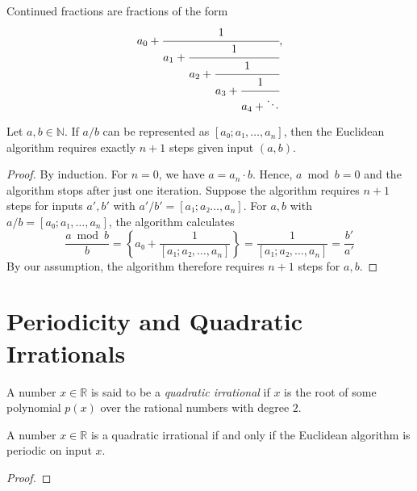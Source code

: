 Continued fractions are fractions of the form
\[
  a_0 + \cfrac{1}{a_1 + \cfrac{1}{a_2 + \cfrac{1}{a_3 + \cfrac{1}{a_4 + \ddots}}}},
\]

\begin{proposition}
  Let $a, b ∈ ℕ$.
  If $a/b$ can be represented as $[a₀; a₁, \dots, a_n]$, then the Euclidean
  algorithm requires exactly $n + 1$ steps given input $(a, b)$.
\end{proposition}

\begin{proof}
  By induction.
  For $n = 0$, we have $a = a_n · b$.
  Hence, $a \bmod b = 0$ and the algorithm stops after just one iteration.
  Suppose the algorithm requires $n + 1$ steps for inputs $a', b'$ with $a'/b' = [a₁; a₂ \dots, a_n]$.
  For $a, b$ with $a/b = [a₀; a₁, \dots, a_n]$, the algorithm calculates
  \[
    \frac{a \bmod b}{b} = \left\{a₀ + \frac{1}{[a₁; a₂, \dots, a_n]} \right\} = \frac{1}{[a₁; a₂, \dots, a_n]} = \frac{b'}{a'}
  \]
  By our assumption, the algorithm therefore requires $n + 1$ steps for $a, b$.
\end{proof}

\section{Periodicity and Quadratic Irrationals}

\begin{definition}
  A number $x ∈ ℝ$ is said to be a \emph{quadratic irrational} if $x$ is the root of some
  polynomial $p(x)$ over the rational numbers with degree $2$.
\end{definition}

\begin{proposition}
  A number $x ∈ ℝ$ is a quadratic irrational
  if and only if the Euclidean algorithm is periodic on input $x$.
\end{proposition}

\begin{proof}

\end{proof}
